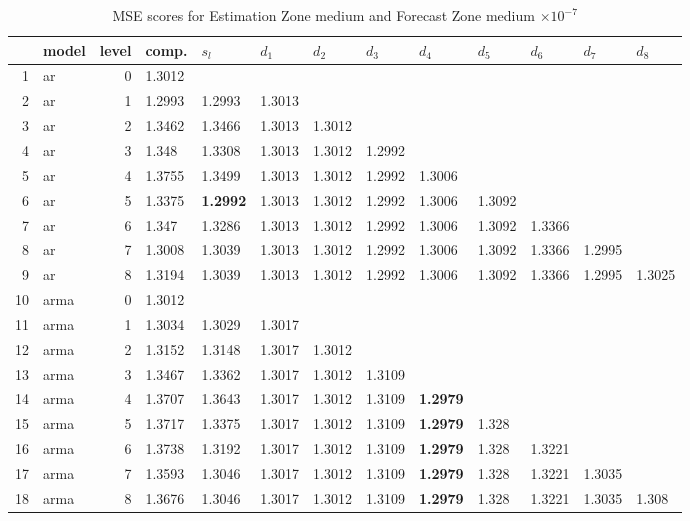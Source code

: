 \documentclass[10pt,a4paper]{article}
\begin{document}
\begin{table}[ht]
\centering
\caption{MSE scores for Estimation Zone medium and Forecast Zone medium $ \times 10^{-7}$} 
\begin{tabular}{rlrllllllllll}
  \hline
 & model & level & comp. & $s_l$ & $d_1$ & $d_2$ & $d_3$ & $d_4$ & $d_5$ & $d_6$ & $d_7$ & $d_8$ \\ 
  \hline
1 & ar &     0 & 1.3012 &  &  &  &  &  &  &  &  &  \\ 
  2 & ar &     1 & 1.2993 & 1.2993 & 1.3013 &  &  &  &  &  &  &  \\ 
  3 & ar &     2 & 1.3462 & 1.3466 & 1.3013 & 1.3012 &  &  &  &  &  &  \\ 
  4 & ar &     3 & 1.348 & 1.3308 & 1.3013 & 1.3012 & 1.2992 &  &  &  &  &  \\ 
  5 & ar &     4 & 1.3755 & 1.3499 & 1.3013 & 1.3012 & 1.2992 & 1.3006 &  &  &  &  \\ 
  6 & ar &     5 & 1.3375 & \textbf{1.2992} & 1.3013 & 1.3012 & 1.2992 & 1.3006 & 1.3092 &  &  &  \\ 
  7 & ar &     6 & 1.347 & 1.3286 & 1.3013 & 1.3012 & 1.2992 & 1.3006 & 1.3092 & 1.3366 &  &  \\ 
  8 & ar &     7 & 1.3008 & 1.3039 & 1.3013 & 1.3012 & 1.2992 & 1.3006 & 1.3092 & 1.3366 & 1.2995 &  \\ 
  9 & ar &     8 & 1.3194 & 1.3039 & 1.3013 & 1.3012 & 1.2992 & 1.3006 & 1.3092 & 1.3366 & 1.2995 & 1.3025 \\ 
   \hline
10 & arma &     0 & 1.3012 &  &  &  &  &  &  &  &  &  \\ 
  11 & arma &     1 & 1.3034 & 1.3029 & 1.3017 &  &  &  &  &  &  &  \\ 
  12 & arma &     2 & 1.3152 & 1.3148 & 1.3017 & 1.3012 &  &  &  &  &  &  \\ 
  13 & arma &     3 & 1.3467 & 1.3362 & 1.3017 & 1.3012 & 1.3109 &  &  &  &  &  \\ 
  14 & arma &     4 & 1.3707 & 1.3643 & 1.3017 & 1.3012 & 1.3109 & \textbf{1.2979} &  &  &  &  \\ 
  15 & arma &     5 & 1.3717 & 1.3375 & 1.3017 & 1.3012 & 1.3109 & \textbf{1.2979} & 1.328 &  &  &  \\ 
  16 & arma &     6 & 1.3738 & 1.3192 & 1.3017 & 1.3012 & 1.3109 & \textbf{1.2979} & 1.328 & 1.3221 &  &  \\ 
  17 & arma &     7 & 1.3593 & 1.3046 & 1.3017 & 1.3012 & 1.3109 & \textbf{1.2979} & 1.328 & 1.3221 & 1.3035 &  \\ 
  18 & arma &     8 & 1.3676 & 1.3046 & 1.3017 & 1.3012 & 1.3109 & \textbf{1.2979} & 1.328 & 1.3221 & 1.3035 & 1.308 \\ 

\end{tabular}
\end{table}
\end{document}
